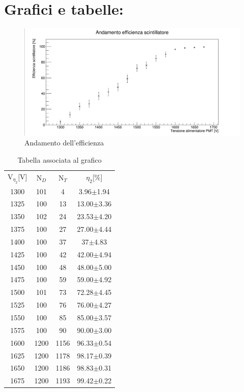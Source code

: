 \documentclass{article}
\begin{document}
\section{Grafici e tabelle:}
\begin{figure}[h!]
    \includegraphics[width=\linewidth]{efficienza scintillatore.jpg} 
    \caption{Andamento dell'efficienza}
    \label{figura1}
\end{figure}
\begin{table}[h!]
  \begin{center}
   \begin{tabular}{|c|c|c|c|}
      V$_{\eta_{2}}$[V]&N$_{D}$&N$_{T}$&$\eta_{2}$[$\%$]\\
      1300&101&4&3.96$\pm$1.94\\
      1325&100&13&13.00$\pm$3.36\\
      1350&102&24&23.53$\pm$4.20\\
      1375&100&27&27.00$\pm$4.44\\
      1400&100&37&37$\pm$4.83\\
      1425&100&42&42.00$\pm$4.94\\
      1450&100&48&48.00$\pm$5.00\\
      1475&100&59&59.00$\pm$4.92\\
      1500&101&73&72.28$\pm$4.45\\
      1525&100&76&76.00$\pm$4.27\\
      1550&100&85&85.00$\pm$3.57\\
      1575&100&90&90.00$\pm$3.00\\
      1600&1200&1156&96.33$\pm$0.54\\
      1625&1200&1178&98.17$\pm$0.39\\
      1650&1200&1186&98.83$\pm$0.31\\
      1675&1200&1193&99.42$\pm$0.22\\
      \end{tabular}
  \caption{Tabella associata al grafico}
  \end{center}
\end{table}
\end{document}
